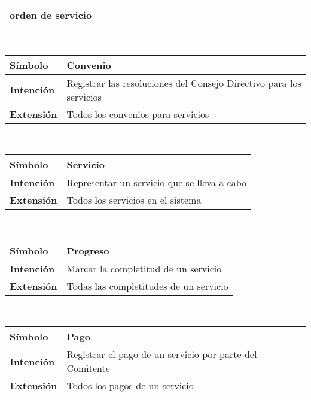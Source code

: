 \begin{center}
{\begin{tabular}{ | p{2.5cm} | p{13cm} | }
	orden de servicio \\
	\hline
\end{tabular}} \\[1cm]
\hypertarget{convenio}{%
\begin{tabular}{ | p{2.5cm} | p{13cm} | }
	\hline
	\cellcolor{lightgray}
	\textbf{S\'imbolo} &
	Convenio  \\
	\hline
	\cellcolor{lightgray}
	\textbf{Intenci\'on} &
	Registrar las resoluciones del Consejo
	Directivo para los servicios \\
	\hline
	\cellcolor{lightgray}
	\textbf{Extensi\'on} &
	Todos los convenios para servicios \\
	\hline
\end{tabular}} \\[1cm]
\hypertarget{servicio}{%
\begin{tabular}{ | p{2.5cm} | p{13cm} | }
	\hline
	\cellcolor{lightgray}
	\textbf{S\'imbolo} &
	Servicio  \\
	\hline
	\cellcolor{lightgray}
	\textbf{Intenci\'on} &
	Representar un servicio que se lleva
	a cabo \\
	\hline
	\cellcolor{lightgray}
	\textbf{Extensi\'on} &
	Todos los servicios en el sistema \\
	\hline
\end{tabular}} \\[1cm]
\hypertarget{progreso}{%
\begin{tabular}{ | p{2.5cm} | p{13cm} | }
	\hline
	\cellcolor{lightgray}
	\textbf{S\'imbolo} &
	Progreso  \\
	\hline
	\cellcolor{lightgray}
	\textbf{Intenci\'on} &
	Marcar la completitud de un servicio \\
	\hline
	\cellcolor{lightgray}
	\textbf{Extensi\'on} &
	Todas las completitudes de un servicio \\
	\hline
\end{tabular}} \\[1cm]
\hypertarget{pago}{%
\begin{tabular}{ | p{2.5cm} | p{13cm} | }
	\hline
	\cellcolor{lightgray}
	\textbf{S\'imbolo} &
	Pago  \\
	\hline
	\cellcolor{lightgray}
	\textbf{Intenci\'on} &
	Registrar el pago de un servicio por
	parte del Comitente \\
	\hline
	\cellcolor{lightgray}
	\textbf{Extensi\'on} &
	Todos los pagos de un servicio \\
	\hline
\end{tabular}} \\[1cm]
\end{center}
\clearpage
